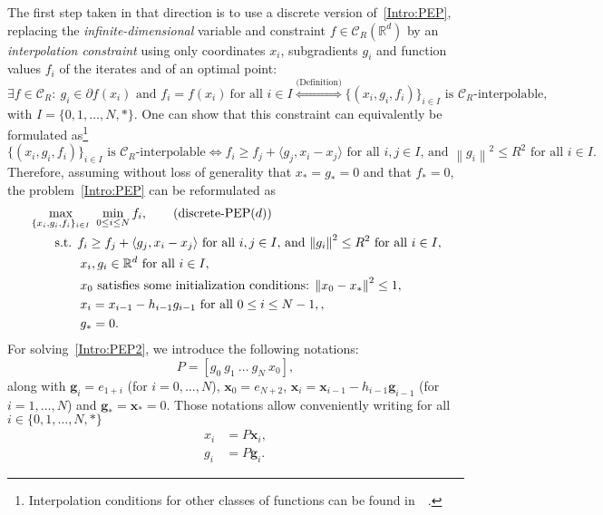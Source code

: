 \documentclass[11pt,a4paper]{article}
\newcommand{\normsq}[1]{{\left\lVert#1\right\rVert}^2}
\newcommand{\Rd}{\mathbb{R}^d}
\newcommand{\inner}[2]{{\langle #1, #2\rangle}}
\newcommand{\bx}{\mathbf{x}}
\newcommand{\bg}{\mathbf{g}}
\begin{document}
The first step taken in that direction is to use a discrete version of~\eqref{Intro:PEP}, replacing the \emph{infinite-dimensional} variable and constraint $f\in \mathcal{C}_R(\Rd)$ by an \emph{interpolation constraint} using only coordinates $x_i$, subgradients $g_i$ and function values $f_i$ of the iterates and of an optimal point:
\[\exists f\in\mathcal{C}_R:\ g_i\in\partial f(x_i) \text{ and } f_i=f(x_i) \ \text{for all } i\in I \overset{\text{(Definition)}}{\Leftrightarrow} \{(x_i,g_i,f_i)\}_{i\in I} \text{ is }\mathcal{C}_R\text{-interpolable},\] with $I=\{0,1,\hdots,N,*\}$.
One can show that this constraint can equivalently be formulated as\footnote{
Interpolation conditions for other classes of functions can be found in~~\cite[Section 3]{taylor2015exact}.}
\[ \{(x_i,g_i,f_i)\}_{i\in I} \text{ is }\mathcal{C}_R\text{-interpolable} \Leftrightarrow f_i\geq f_j+\inner{g_j}{x_i-x_j}\text{ for all } i,j\in I\text{, and } \normsq{g_i}\leq R^2 \text{ for all }i\in I.\]
Therefore, assuming without loss of generality that $x_*=g_*=0$ and that $f_*=0$, the problem~\eqref{Intro:PEP} can be reformulated as
\begin{align}
&\max_{\{x_i,g_i,f_i\}_{i\in I}} \ \min_{0\leq i\leq N} f_i,  \tag{discrete-PEP$(d)$}\label{Intro:PEP2} \\
&\quad\quad \text{s.t. } f_i\geq f_j+\inner{g_j}{x_i-x_j}\text{ for all } i,j\in I\text{, and } \normsq{g_i}\leq R^2 \text{ for all }i\in I,  \notag\\
&\quad\quad\quad\quad    x_i,g_i\in\Rd \text{ for all }i\in I,\notag\\
&\quad\quad\quad\quad    x_0 \text{ satisfies some initialization conditions: } \normsq{x_0-x_*}\leq 1\notag, \\
&\quad\quad\quad\quad    x_{i}=x_{i-1}-h_{i-1}g_{i-1} \text{ for all } 0 \le i \le N-1, 
\notag,\\
&\quad\quad\quad\quad    g_*=0. \notag
\end{align}
For solving~\eqref{Intro:PEP2}, we introduce the following notations:
\[P=[g_0 \ g_1 \ \hdots \ g_N \ x_0],\]
along with $\bg_i=e_{1+i}$ (for $i=0,\hdots,N$), $\bx_0=e_{N+2}$, $\bx_{i}=\bx_{i-1}-h_{i-1}\bg_{i-1}$ (for $i=1,\hdots,N$) and $\bg_*=\bx_*=0$. Those notations allow conveniently writing for all $i\in\{0,1,\hdots,N,*\}$
\begin{equation*}
\begin{aligned}
x_i&=P\bx_i,\\
g_i&=P\bg_i.
\end{aligned}
\end{equation*}
\end{document}
